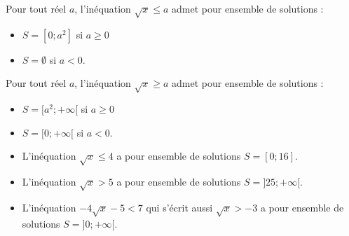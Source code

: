 \begin{minipage}[c]{0.68\linewidth}
\begin{Propriété}
Pour tout réel $a$, l'inéquation $\sqrt{x}\leq a$ admet pour ensemble de solutions :
\begin{itemize}[label=\textcolor{Couleur2}{$\bullet$}]
\item $S=[0;a^2]$ si $a\geq 0$
\item $S=\emptyset$ si $a<0$.
\end{itemize}
Pour tout réel $a$, l'inéquation $\sqrt{x}\geq a$ admet pour ensemble de solutions :
\begin{itemize}[label=\textcolor{Couleur2}{$\bullet$}]
\item $S=[a^2;+\infty[$ si $a\geq 0$
\item $S=[0;+\infty[$ si $a<0$.
\end{itemize}
\end{Propriété}
\begin{Exemple}
\leavevmode\vspace{-\baselineskip}
\begin{itemize}[label=\textcolor{Couleur8}{$\bullet$}]
\item L'inéquation $\sqrt{x}\leq 4$ a pour ensemble de solutions $S=[0;16]$.
\item L'inéquation $\sqrt{x}>5$ a pour ensemble de solutions $S=]25;+\infty[$.
\item L'inéquation $-4\sqrt{x}-5<7$ qui s'écrit aussi $\sqrt{x}>-3$ a pour ensemble de solutions $S=]0;+\infty[$.
\end{itemize}

\end{Exemple}

\end{minipage} \hfill
